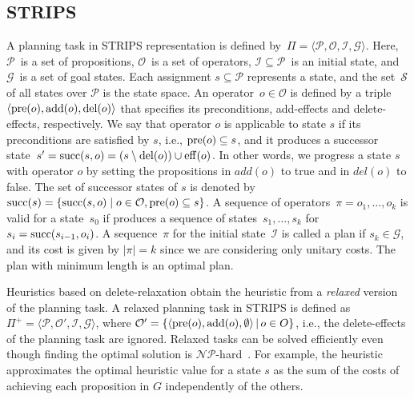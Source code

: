 \documentclass[ppgc,diss,english]{iiufrgs}
\begin{document}
\subsection{STRIPS}
\label{sec:background-strips}
A planning task in STRIPS representation is defined by~$\Pi=\langle\mathcal{P},\mathcal{O},\mathcal{I},\mathcal{G}\rangle$. Here, $\mathcal{P}$~is a set of propositions, $\mathcal{O}$~is a set of operators, $\mathcal{I} \subseteq \mathcal{P}$~is an initial state, and $\mathcal{G}$~is a set of goal states. Each assignment $s \subseteq \mathcal{P}$ represents a state, and the set~$\mathcal{S}$ of all states over $\mathcal{P}$ is the state space.
An operator~$o \in \mathcal{O}$ is defined by a triple~$\langle\operatorname{pre}(o),\operatorname{add}(o),\operatorname{del}(o)\rangle$ that specifies its preconditions, add-effects and delete-effects, respectively. We say that operator $o$ is applicable to state $s$ if its preconditions are satisfied by $s$, i.e., $\operatorname{pre}(o) \subseteq s$, and it produces a successor state~$s' = \operatorname{succ}(s,o) = (s \setminus \operatorname{del}(o)) \cup \operatorname{eff}(o)$. In other words, we progress a state $s$ with operator $o$ by setting the propositions in $add(o)$ to true and in $del(o)$ to false. The set of successor states of $s$ is denoted by~$\operatorname{succ}(s)=\{\operatorname{succ}(s,o)\mid o\in \mathcal{O}, \operatorname{pre}(o) \subseteq s\}$.
A sequence of operators~$\pi=o_1,\ldots,o_k$ is valid for a state~$s_0$ if produces a sequence of states~$s_1,\ldots,s_k$ for $s_i=\operatorname{succ}(s_{i-1},o_i)$. A sequence~$\pi$ for the initial state~$\mathcal{I}$ is called a plan if $s_k \in \mathcal{G}$, and its cost is given by $|\pi| = k$ since we are considering only unitary costs. The plan with minimum length is an optimal plan.

Heuristics based on delete-relaxation obtain the heuristic from a \emph{relaxed} version of the planning task. A relaxed planning task in STRIPS is defined as $\Pi^{+}=\langle\mathcal{P},\mathcal{O'},\mathcal{I},\mathcal{G}\rangle$, where $\mathcal{O'} = \{ \langle \operatorname{pre}(o), \operatorname{add}(o), \emptyset \rangle \,|\, o \in O \}$, i.e., the delete-effects of the planning task are ignored. Relaxed tasks can be solved efficiently even though finding the optimal solution is $\mathcal{NP}$-hard~\cite{Bylander/1994}. For example, the heuristic \hadd approximates the optimal heuristic value for a state $s$ as the sum of the costs of achieving each proposition in $G$ independently of the others.
\end{document}
